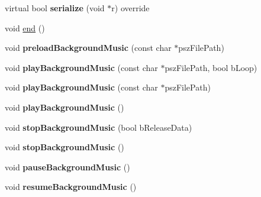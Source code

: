 \begin{DoxyCompactItemize}
\item 
\mbox{\label{classcocostudio_1_1ComAudio_aac5a142aac46251b11ba12ee8e4f2ec8}} 
virtual bool {\bfseries serialize} (void $\ast$r) override
\item 
void \hyperlink{classcocostudio_1_1ComAudio_aa38fa3a5a6bfdfd2844b3b4514cebcb7}{end} ()
\item 
\mbox{\label{classcocostudio_1_1ComAudio_a890bccf01a5a2090a5055c48d0440c7b}} 
void {\bfseries preload\+Background\+Music} (const char $\ast$psz\+File\+Path)
\item 
\mbox{\label{classcocostudio_1_1ComAudio_a9576b5132ade431e75d14fb15c432db9}} 
void {\bfseries play\+Background\+Music} (const char $\ast$psz\+File\+Path, bool b\+Loop)
\item 
\mbox{\label{classcocostudio_1_1ComAudio_aab9b17bac41b047ab1415d90dc81ad8e}} 
void {\bfseries play\+Background\+Music} (const char $\ast$psz\+File\+Path)
\item 
\mbox{\label{classcocostudio_1_1ComAudio_a6638b020b4866779630ec766ae81e793}} 
void {\bfseries play\+Background\+Music} ()
\item 
\mbox{\label{classcocostudio_1_1ComAudio_a2caf29458945eab115b90f574921a11b}} 
void {\bfseries stop\+Background\+Music} (bool b\+Release\+Data)
\item 
\mbox{\label{classcocostudio_1_1ComAudio_a3af37f36145d1b685d43ec5b59d1f18a}} 
void {\bfseries stop\+Background\+Music} ()
\item 
\mbox{\label{classcocostudio_1_1ComAudio_a11613ea4cdeb6360f4d2d89d3c065862}} 
void {\bfseries pause\+Background\+Music} ()
\item 
\mbox{\label{classcocostudio_1_1ComAudio_a4a896cf1181f776fc78e0a8bc8ecdaf7}} 
void {\bfseries resume\+Background\+Music} ()
\item 
\mbox{\label{classcocostudio_1_1ComAudio_a297fc0126dd92e41a99d30ca76ed4667}} 

\end{DoxyCompactItemize}
